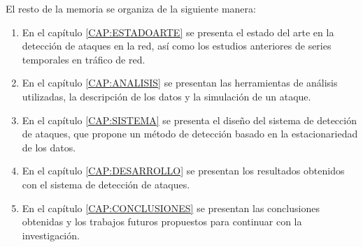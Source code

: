 El resto de la memoria se organiza de la siguiente manera:
\begin{enumerate}
    \item En el capítulo \ref{CAP:ESTADOARTE} se presenta el estado del arte en la detección de ataques en la red, así como los estudios anteriores de series temporales en tráfico de red.
    \item En el capítulo \ref{CAP:ANALISIS} se presentan las herramientas de análisis utilizadas, la descripción de los datos y la simulación de un ataque.
    \item En el capítulo \ref{CAP:SISTEMA} se presenta el diseño del sistema de detección de ataques, que propone un método de detección basado en la estacionariedad de los datos.
    \item En el capítulo \ref{CAP:DESARROLLO} se presentan los resultados obtenidos con el sistema de detección de ataques.
    \item En el capítulo \ref{CAP:CONCLUSIONES} se presentan las conclusiones obtenidas y los trabajos futuros propuestos para continuar con la investigación.
\end{enumerate}